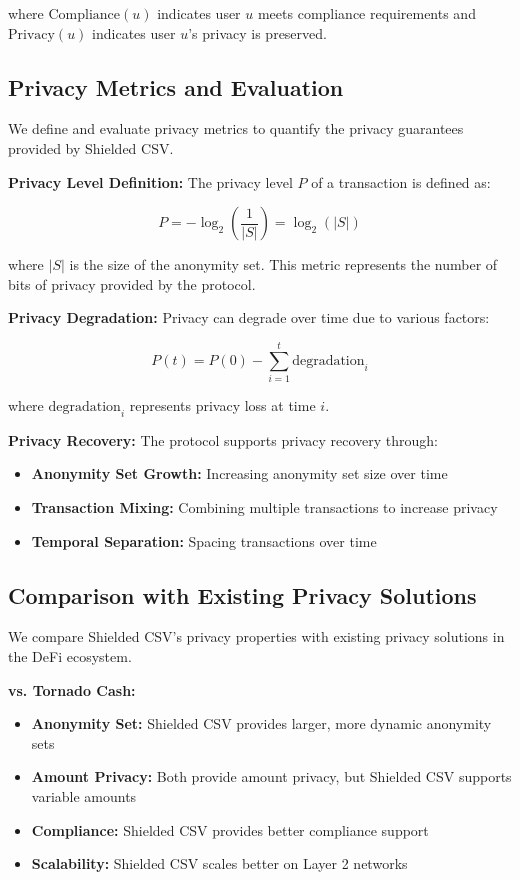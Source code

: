 \documentclass[11pt,a4paper]{article}
\begin{document}
where $\text{Compliance}(u)$ indicates user $u$ meets compliance requirements and $\text{Privacy}(u)$ indicates user $u$'s privacy is preserved.

\subsection{Privacy Metrics and Evaluation}

We define and evaluate privacy metrics to quantify the privacy guarantees provided by Shielded CSV.

\textbf{Privacy Level Definition:}
The privacy level $P$ of a transaction is defined as:

\begin{equation}
P = -\log_2\left(\frac{1}{|S|}\right) = \log_2(|S|)
\end{equation}

where $|S|$ is the size of the anonymity set. This metric represents the number of bits of privacy provided by the protocol.

\textbf{Privacy Degradation:}
Privacy can degrade over time due to various factors:

\begin{equation}
P(t) = P(0) - \sum_{i=1}^{t} \text{degradation}_i
\end{equation}

where $\text{degradation}_i$ represents privacy loss at time $i$.

\textbf{Privacy Recovery:}
The protocol supports privacy recovery through:

\begin{itemize}
    \item \textbf{Anonymity Set Growth:} Increasing anonymity set size over time
    \item \textbf{Transaction Mixing:} Combining multiple transactions to increase privacy
    \item \textbf{Temporal Separation:} Spacing transactions over time
\end{itemize}

\subsection{Comparison with Existing Privacy Solutions}

We compare Shielded CSV's privacy properties with existing privacy solutions in the DeFi ecosystem.

\textbf{vs. Tornado Cash:}
\begin{itemize}
    \item \textbf{Anonymity Set:} Shielded CSV provides larger, more dynamic anonymity sets
    \item \textbf{Amount Privacy:} Both provide amount privacy, but Shielded CSV supports variable amounts
    \item \textbf{Compliance:} Shielded CSV provides better compliance support
    \item \textbf{Scalability:} Shielded CSV scales better on Layer 2 networks
\end{itemize}
\end{document}
